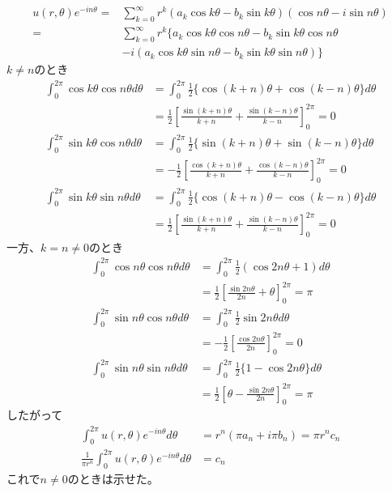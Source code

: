 \begin{align*}
    u(r,\theta)e^{-in\theta}
    =&\sum_{k=0}^{\infty}r^k(a_k\cos k\theta-b_k\sin k\theta)(\cos n\theta-i\sin n\theta)\\
    =&\sum_{k=0}^{\infty}r^k
    \{a_k\cos k\theta\cos n\theta-b_k\sin k\theta\cos n\theta
    \\
    &-i(a_k\cos k\theta\sin n\theta-b_k\sin k\theta\sin n\theta)\}
\end{align*}
$k\neq n$のとき
\begin{align*}
    \int_{0}^{2\pi}\cos k\theta\cos n\theta d\theta
    &=\int_{0}^{2\pi}\frac{1}{2}\{\cos(k+n)\theta+\cos(k-n)\theta\} d\theta\\
    &=\frac{1}{2}\left[\frac{\sin(k+n)\theta}{k+n}+\frac{\sin(k-n)\theta}{k-n}\right]_0^{2\pi}=0\\
    \int_{0}^{2\pi}\sin k\theta\cos n\theta d\theta
    &=\int_{0}^{2\pi}\frac{1}{2}\{\sin(k+n)\theta+\sin(k-n)\theta\} d\theta\\
    &=-\frac{1}{2}\left[\frac{\cos(k+n)\theta}{k+n}+\frac{\cos(k-n)\theta}{k-n}\right]_0^{2\pi}=0\\
    \int_{0}^{2\pi}\sin k\theta\sin n\theta d\theta
    &=\int_{0}^{2\pi}\frac{1}{2}\{\cos(k+n)\theta-\cos(k-n)\theta\} d\theta\\
    &=\frac{1}{2}\left[\frac{\sin(k+n)\theta}{k+n}+\frac{\sin(k-n)\theta}{k-n}\right]_0^{2\pi}=0
\end{align*}
一方、$k=n\neq0$のとき
\begin{align*}
    \int_{0}^{2\pi}\cos n\theta\cos n\theta d\theta
    &=\int_{0}^{2\pi}\frac{1}{2}(\cos 2n\theta+1) d\theta\\
    &=\frac{1}{2}\left[\frac{\sin 2n\theta}{2n}+\theta\right]_0^{2\pi}=\pi\\
    \int_{0}^{2\pi}\sin n\theta\cos n\theta d\theta
    &=\int_{0}^{2\pi}\frac{1}{2}\sin 2n\theta d\theta\\
    &=-\frac{1}{2}\left[\frac{\cos 2n\theta}{2n}\right]_0^{2\pi}=0\\
    \int_{0}^{2\pi}\sin n\theta\sin n\theta d\theta
    &=\int_{0}^{2\pi}\frac{1}{2}\{1-\cos 2n\theta\} d\theta\\
    &=\frac{1}{2}\left[\theta-\frac{\sin 2n\theta}{2n}\right]_0^{2\pi}=\pi
\end{align*}
したがって
\begin{align*}
    \int_{0}^{2\pi}u(r,\theta)e^{-in\theta}d\theta
    &=r^n(\pi a_n+i\pi b_n)=\pi r^nc_n\\
    \frac{1}{\pi r^n}\int_{0}^{2\pi}u(r,\theta)e^{-in\theta}d\theta
    &=c_n
\end{align*}
これで$n\neq0$のときは示せた。
